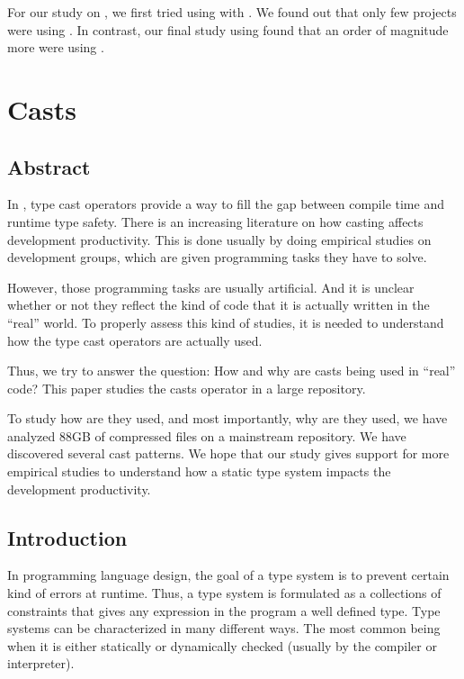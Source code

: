 For our study on \smu{}, we first tried using \boa{} with \sourceforge{}.
We found out that only few projects were using \smu{}.
In contrast, our final study using \maven{} found that an order of magnitude more were using \smu{}.

\chapter{Casts \label{org686b6a5}}
\label{sec:orgbdd6f24}
\section{Abstract}
\label{sec:org22d1770}

In \java, type cast operators provide a way to fill the gap between compile time and runtime type safety. 
There is an increasing literature on how casting affects development productivity. 
This is done usually by doing empirical studies on development groups, which are given programming tasks they have to solve. 

However, those programming tasks are usually artificial. 
And it is unclear whether or not they reflect the kind of code that it is actually written in the ``real'' world. 
To properly assess this kind of studies, it is needed to understand how the type cast operators are actually used. 

Thus, we try to answer the question: 
How and why are casts being used in ``real'' \java{} code? 
This paper studies the casts operator in a large \java{} repository. 

To study how are they used, and most importantly, why are they used, we have analyzed 88GB of compressed \jar{} files on a mainstream \java{} repository. 
We have discovered several cast patterns. 
We hope that our study gives support for more empirical studies to understand how a static type system impacts the development productivity.

\section{Introduction}
\label{sec:orgd1d4548}
In programming language design, the goal of a type system is to prevent certain kind of errors at runtime. 
Thus, a type system is formulated as a collections of constraints that gives any expression in the program a well defined type. 
Type systems can be characterized in many different ways. 
The most common being when it is either statically or dynamically checked (usually by the compiler or interpreter). 

